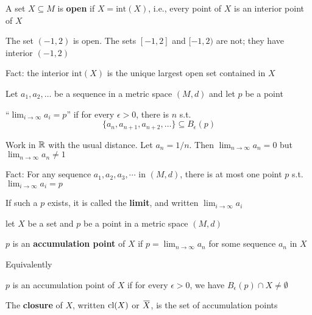 \documentclass[11pt]{article}
\def \tint {\text{int}}
\begin{document}
\begin{definition}[]
A set \(X\subseteq M\) is \textbf{open} if \(X=\tint(X)\), i.e., every point of \(X\) is an interior point of \(X\)
\end{definition}

\begin{examplle}[in \(\R\)]
The set \((-1,2)\) is open. The sets \([-1,2]\) and \([-1,2)\) are not; they have interior \((-1,2)\)
\end{examplle}

Fact: the interior \(\tint(X)\) is the unique largest open set contained in \(X\)

Let \(a_1,a_2,\dots\) be a sequence in a metric space \((M,d)\) and let \(p\) be a point
\begin{definition}[]
``\(\lim_{i\to\infty}a_i=p\)'' if for every \(\epsilon>0\), there is \(n\) s.t.
\begin{equation*}
\{a_n,a_{n+1},a_{n+2},\dots\}\subseteq B_\epsilon(p)
\end{equation*}
\end{definition}

\begin{examplle}[]
Work in \(\R\) with the usual distance. Let \(a_n=1/n\). Then \(\lim_{n\to\infty}a_n=0\)
but \(\lim_{n\to\infty}a_n\neq 1\)
\end{examplle}

Fact: For any sequence \(a_1,a_2,a_3,\cdots\) in \((M,d)\), there is at most one point \(p\)
s.t. \(\lim_{i\to\infty}a_i=p\)

If such a \(p\) exists, it is called the \textbf{limit}, and written \(\lim_{i\to\infty}a_i\)

let \(X\) be a set and \(p\) be a point in a metric space \((M,d)\)

\begin{definition}[]
\(p\) is an \textbf{accumulation point} of \(X\) if \(p=\lim_{n\to\infty}a_n\) for some sequence \(a_n\) in \(X\)
\end{definition}

Equivalently
\begin{definition}[]
\(p\) is an accumulation point of \(X\) if for every \(\epsilon>0\), we have \(B_\epsilon(p)\cap X\neq\emptyset\)
\end{definition}

\begin{definition}[]
The \textbf{closure} of \(X\), written \(\operatorname{\text{cl}}(X)\) or \(\barX\), is the set of accumulation points
\end{definition}
\end{document}

